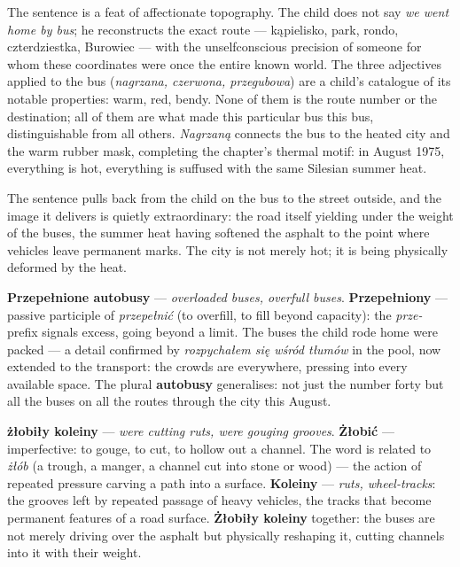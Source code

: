 \medskip
The sentence is a feat of affectionate topography.
The child does not say \textit{we went home by
bus}; he reconstructs the exact route ---
kąpielisko, park, rondo, czterdziestka,
Burowiec --- with the unselfconscious precision
of someone for whom these coordinates were once
the entire known world. The three adjectives
applied to the bus (\textit{nagrzana, czerwona,
przegubowa}) are a child's catalogue of its
notable properties: warm, red, bendy. None of
them is the route number or the destination;
all of them are what made this particular bus
this bus, distinguishable from all others.
\textit{Nagrzaną} connects the bus to the
heated city and the warm rubber mask, completing
the chapter's thermal motif: in August 1975,
everything is hot, everything is suffused with
the same Silesian summer heat.



The sentence pulls back from the child on the bus
to the street outside, and the image it delivers
is quietly extraordinary: the road itself yielding
under the weight of the buses, the summer heat
having softened the asphalt to the point where
vehicles leave permanent marks. The city is not
merely hot; it is being physically deformed by
the heat.

\textbf{Przepełnione autobusy} --- \textit{overloaded
buses, overfull buses}. \textbf{Przepełniony} ---
passive participle of \textit{przepełnić} (to
overfill, to fill beyond capacity): the \textit{prze-}
prefix signals excess, going beyond a limit.
The buses the child rode home were packed --- a
detail confirmed by \textit{rozpychałem się wśród
tłumów} in the pool, now extended to the transport:
the crowds are everywhere, pressing into every
available space. The plural \textbf{autobusy}
generalises: not just the number forty but all
the buses on all the routes through the city this
August.

\textbf{żłobiły koleiny} --- \textit{were cutting
ruts, were gouging grooves}. \textbf{Żłobić} ---
imperfective: to gouge, to cut, to hollow out a
channel. The word is related to \textit{żłób}
(a trough, a manger, a channel cut into stone or
wood) --- the action of repeated pressure carving
a path into a surface. \textbf{Koleiny} ---
\textit{ruts, wheel-tracks}: the grooves left by
repeated passage of heavy vehicles, the tracks
that become permanent features of a road surface.
\textbf{Żłobiły koleiny} together: the buses are
not merely driving over the asphalt but physically
reshaping it, cutting channels into it with their
weight.

